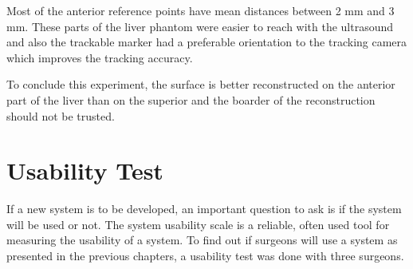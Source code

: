 Most of the anterior reference points have mean distances between 2 mm and 3 mm.
These parts of the liver phantom were easier to reach with the ultrasound and
also the trackable marker had a preferable orientation to the tracking camera
which improves the tracking accuracy.

To conclude this experiment, the surface is better reconstructed on the anterior
part of the liver than on the superior and the boarder of the reconstruction should
not be trusted. 


\section{Usability Test}
If a new system is to be developed, an important question to ask is if the
system will be used or not.
The system usability scale is a reliable, often used tool for measuring the
usability of a system. 
To find out if surgeons will use a system as presented in the previous chapters,
a usability test was done with three surgeons.

